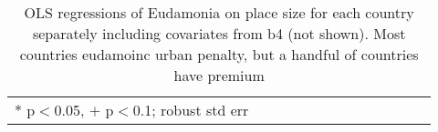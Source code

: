 \documentclass[10pt, letterpaper]{article}
\begin{document}
\begin{spacing}{1.4}
\begin{spacing}{.9} \begin{table}[H]\centering   \begin{scriptsize} \begin{tabular}{p{.5in}p{.5in}p{.5in}p{.5in}p{.5in}p{.5in}p{.5in}p{.5in}p{.5in}p{.5in}p{.5
                                                                      in}p{.5in}p{.5
                                                                      in}}\hline
                                                                      
                                                                      \hline *
                                                                      p$<$0.05,
                                                                      $+$
                                                                      p$<$0.1;
                                                                      robust std
                                                                      err \end{tabular}\end{scriptsize}\caption{\label{b4cou}OLS
                                                                    regressions
                                                                    of Eudamonia on
                                                                    place size
                                                                    for each
                                                                    country
                                                                    separately
                                                                    including
                                                                    covariates
                                                                    from b4 (not
                                                                    shown). Most
                                                                    countries
                                                                    eudamoinc
                                                                    urban
                                                                    penalty, but
                                                                    a
                                                                    handful of
                                                                    countries
                                                                    have premium
                                                           }\end{table} \end{spacing}





\end{spacing}
\end{document}
